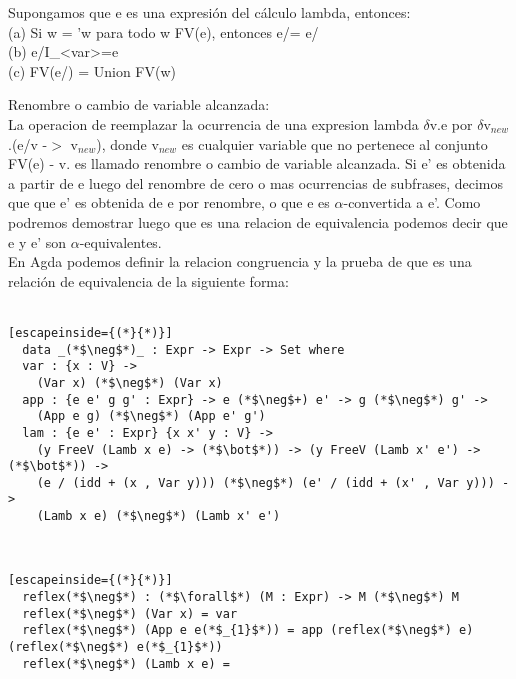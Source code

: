 \documentclass{book}
\begin{document}
\begin{proposition}[Proposicion]
  Supongamos que e es una expresión del cálculo lambda, entonces:\\
  (a) Si \delta w = \delta 'w para todo w \in FV(e), entonces e/\delta = e/\delta\\
  (b) e/I_{<var>}=e\\
  (c) FV(e/\delta) = Union FV(\delta w) \\
\end{proposition}



 Renombre o cambio de variable alcanzada:\\
 La operacion de reemplazar la ocurrencia de una expresion lambda $\delta$v.e por $\delta$v$_{new}$.(e/v -$>$ v$_{new}$), donde v$_{new}$ es cualquier variable que no pertenece al conjunto FV(e) - {v}. es llamado renombre o cambio de variable alcanzada.
 Si e' es obtenida a partir de e luego del renombre de cero o mas ocurrencias de subfrases, decimos que que e' es obtenida de e por renombre, o que e es $\alpha$-convertida a e'. Como podremos demostrar luego que es una relacion de equivalencia podemos decir que e y e' son $\alpha$-equivalentes.\\
 En Agda podemos definir la relacion congruencia y la prueba de que es una relación de equivalencia de la siguiente forma:\\ \\
 
\begin{lstlisting}[escapeinside={(*}{*)}]
  data _(*$\neg$*)_ : Expr -> Expr -> Set where
  var : {x : V} ->
    (Var x) (*$\neg$*) (Var x)
  app : {e e' g g' : Expr} -> e (*$\neg$+) e' -> g (*$\neg$*) g' ->
    (App e g) (*$\neg$*) (App e' g')
  lam : {e e' : Expr} {x x' y : V} ->
    (y FreeV (Lamb x e) -> (*$\bot$*)) -> (y FreeV (Lamb x' e') -> (*$\bot$*)) ->
    (e / (idd + (x , Var y))) (*$\neg$*) (e' / (idd + (x' , Var y))) ->
    (Lamb x e) (*$\neg$*) (Lamb x' e')
\end{lstlisting} \\

\begin{lstlisting}[escapeinside={(*}{*)}]
  reflex(*$\neg$*) : (*$\forall$*) (M : Expr) -> M (*$\neg$*) M
  reflex(*$\neg$*) (Var x) = var
  reflex(*$\neg$*) (App e e(*$_{1}$*)) = app (reflex(*$\neg$*) e) (reflex(*$\neg$*) e(*$_{1}$*))
  reflex(*$\neg$*) (Lamb x e) =
\end{lstlisting}
 
\end{document}
